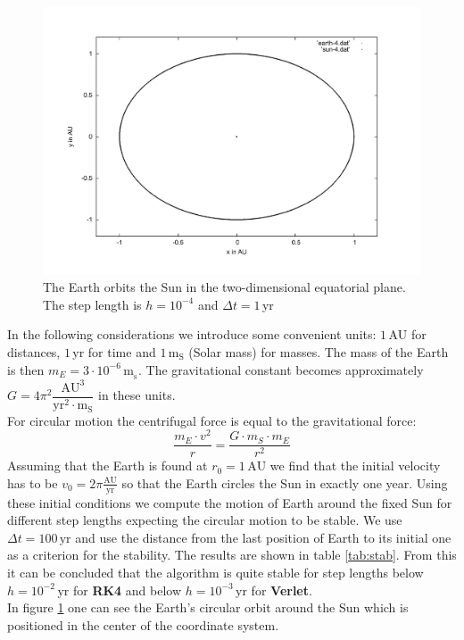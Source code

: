 \documentclass[11pt,a4wide]{article}
\begin{document}
	\begin{figure}
		\centering
			\includegraphics[scale=0.45]{earth.pdf}
		\caption{The Earth orbits the Sun in the two-dimensional equatorial plane. The step length is $h=10^{-4}$ and $\Delta t=1$\,yr}
		\label{fig:earth}
	\end{figure}
	
	In the following considerations we introduce some convenient units: $1\,\text{AU}$ for distances, $1\,\text{yr}$ for time and $1\,\text{m}_{\text{S}}$ (Solar mass) for masses. The mass of the Earth is then $m_E=3\cdot 10^{-6}\,\text{m}__{\text{S}}$. The gravitational constant becomes approximately $G=4\pi^2\dfrac{\text{AU}^3}{\text{yr}^2\cdot \text{m}_\text{S}}$ in these units.
	\\
	For circular motion the centrifugal force is equal to the gravitational force:
	\begin{equation}
	\dfrac{m_E\cdot v^2}{r}=\dfrac{G\cdot m_S\cdot m_E}{r^2}
	\label{eq:cm}
	\end{equation}
	Assuming that the Earth is found at $r_0=1\,\text{AU}$ we find that the initial velocity has to be $v_0=2\pi\frac{\text{AU}}{\text{yr}}$ so that the Earth circles the Sun in exactly one year. Using these initial conditions we compute the motion of Earth around the fixed Sun for different step lengths expecting the circular motion to be stable. We use $\Delta t=100\,\text{yr}$ and use the distance from the last position of Earth to its initial one as a criterion for the stability. The results are shown in table \ref{tab:stab}. From this it can be concluded that the algorithm is quite stable for step lengths below $h=10^{-2}\,\text{yr}$ for \textbf{RK4} and below $h=10^{-3}\,\text{yr}$ for \textbf{Verlet}.
	\\
	In figure \ref{fig:earth} one can see the Earth's circular orbit around the Sun which is positioned in the center of the coordinate system. 
\end{document}
